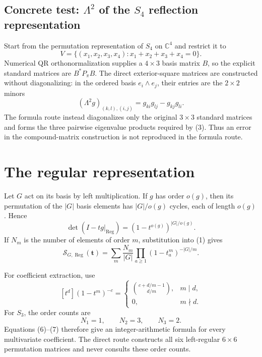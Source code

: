 \documentclass[11pt]{article}
\newcommand{\Sfun}{\mathcal S}
\newcommand{\Reg}{\operatorname{Reg}}
\begin{document}
\subsection{Concrete test: $\Lambda^2$ of the $S_4$ reflection representation}

Start from the permutation representation of $S_4$ on $\mathbb C^4$ and
restrict it to
\[
V=\{(x_1,x_2,x_3,x_4):x_1+x_2+x_3+x_4=0\}.
\]
Numerical QR orthonormalization supplies a $4\times3$ basis matrix $B$, so the
explicit standard matrices are $B^*P_\pi B$.  The direct exterior-square
matrices are constructed without diagonalizing: in the ordered basis
$e_i\wedge e_j$, their entries are the $2\times2$ minors
\begin{equation}
(\Lambda^2g)_{(k,l),(i,j)}
=g_{ki}g_{lj}-g_{kj}g_{li}.                                  \tag{4}
\end{equation}
The formula route instead diagonalizes only the original $3\times3$ standard
matrices and forms the three pairwise eigenvalue products required by (3).
Thus an error in the compound-matrix construction is not reproduced in the
formula route.

\section{The regular representation}

Let $G$ act on its basis by left multiplication.  If $g$ has order $o(g)$,
then its permutation of the $|G|$ basis elements has $|G|/o(g)$ cycles, each of
length $o(g)$.  Hence
\begin{equation}
\det(I-tg|_{\Reg})=(1-t^{o(g)})^{|G|/o(g)}.                   \tag{5}
\end{equation}
If $N_m$ is the number of elements of order $m$, substitution into (1) gives
\begin{equation}
\Sfun_{G,\Reg}(\mathbf t)=\sum_m\frac{N_m}{|G|}
\prod_{a\geq1}(1-t_a^m)^{-|G|/m}.                            \tag{6}
\end{equation}

For coefficient extraction, use
\[
[t^d](1-t^m)^{-c}=
\begin{cases}
\binom{c+d/m-1}{d/m},&m\mid d,\\
0,&m\nmid d.
\end{cases}
\]
For $S_3$, the order counts are
\begin{equation}
N_1=1,\qquad N_2=3,\qquad N_3=2.                              \tag{7}
\end{equation}
Equations (6)--(7) therefore give an integer-arithmetic formula for every
multivariate coefficient.  The direct route constructs all six left-regular
$6\times6$ permutation matrices and never consults these order counts.
\end{document}
